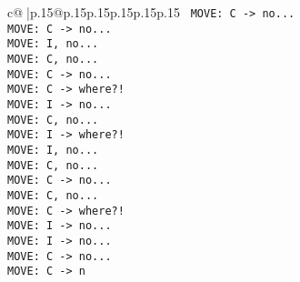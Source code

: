 \documentclass{article}
\begin{document}
{\begin{supertabular}{c@{$\;$}|p{.15\linewidth}@{}p{.15\linewidth}p{.15\linewidth}p{.15\linewidth}p{.15\linewidth}p{.15\linewidth}}
{{{\ \tt  MOVE: C -> no...\\ \tt  MOVE: C -> no...\\ \tt  MOVE: I, no...\\ \tt  MOVE: C, no...\\ \tt  MOVE: C -> no...\\ \tt  MOVE: C -> where?!\\ \tt  MOVE: I -> no...\\ \tt  MOVE: C, no...\\ \tt  MOVE: I -> where?!\\ \tt  MOVE: I, no...\\ \tt  MOVE: C, no...\\ \tt  MOVE: C -> no...\\ \tt  MOVE: C, no...\\ \tt  MOVE: C -> where?!\\ \tt  MOVE: I -> no...\\ \tt  MOVE: I -> no...\\ \tt  MOVE: C -> no...\\ \tt  MOVE: C -> n}}}
\end{supertabular}}
\end{document}
